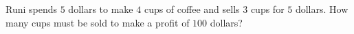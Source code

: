 Runi spends $5$ dollars to make $4$ cups of coffee and sells $3$ cups for $5$ dollars. How many cups must be sold to make a profit of $100$ dollars?
